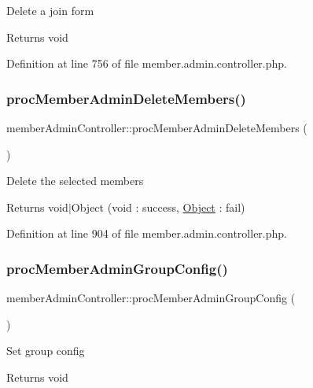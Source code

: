 Delete a join form \begin{DoxyReturn}{Returns}
void 
\end{DoxyReturn}


Definition at line 756 of file member.\+admin.\+controller.\+php.

\hypertarget{classmemberAdminController_a1c84f5c32acd6c0fada7806c179108df}{}\label{classmemberAdminController_a1c84f5c32acd6c0fada7806c179108df} 
\subsubsection{\texorpdfstring{proc\+Member\+Admin\+Delete\+Members()}{procMemberAdminDeleteMembers()}}
{\footnotesize\ttfamily member\+Admin\+Controller\+::proc\+Member\+Admin\+Delete\+Members (\begin{DoxyParamCaption}{ }\end{DoxyParamCaption})}

Delete the selected members \begin{DoxyReturn}{Returns}
void$\vert$\+Object (void \+: success, \hyperlink{classObject}{Object} \+: fail) 
\end{DoxyReturn}


Definition at line 904 of file member.\+admin.\+controller.\+php.

\hypertarget{classmemberAdminController_a3f05ea4475dfc91d5252ed38d2cac10a}{}\label{classmemberAdminController_a3f05ea4475dfc91d5252ed38d2cac10a} 
\subsubsection{\texorpdfstring{proc\+Member\+Admin\+Group\+Config()}{procMemberAdminGroupConfig()}}
{\footnotesize\ttfamily member\+Admin\+Controller\+::proc\+Member\+Admin\+Group\+Config (\begin{DoxyParamCaption}{ }\end{DoxyParamCaption})}

Set group config \begin{DoxyReturn}{Returns}
void 
\end{DoxyReturn}


